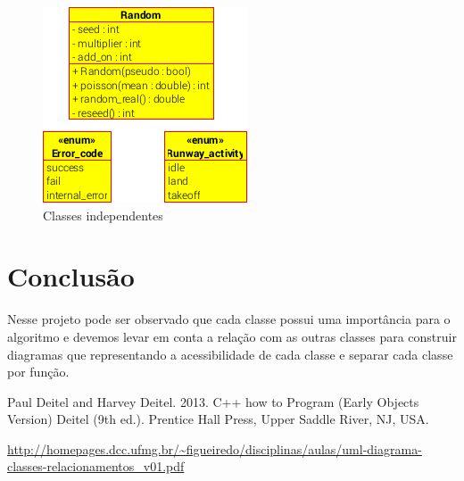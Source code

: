 \documentclass[conference]{IEEEtran}
\begin{document}
\begin{figure}[htb]
	\caption{\label{b3}Classes independentes}
	\begin{center}
	    \includegraphics[scale=0.6]{figs/independt.png}
	\end{center}
\end{figure}

\section{Conclusão}

Nesse projeto pode ser observado que cada classe possui uma importância para o algoritmo e devemos levar em conta a relação com as outras classes para construir diagramas que representando a acessibilidade de cada classe e separar cada classe por função.




\begin{thebibliography}{00}

 {Paul Deitel and Harvey Deitel. 2013. C++ how to Program (Early Objects Version) Deitel (9th ed.). Prentice Hall Press, Upper Saddle River, NJ, USA. 
}

\url{http://homepages.dcc.ufmg.br/~figueiredo/disciplinas/aulas/uml-diagrama-classes-relacionamentos_v01.pdf}
\end{thebibliography}


\end{document}
